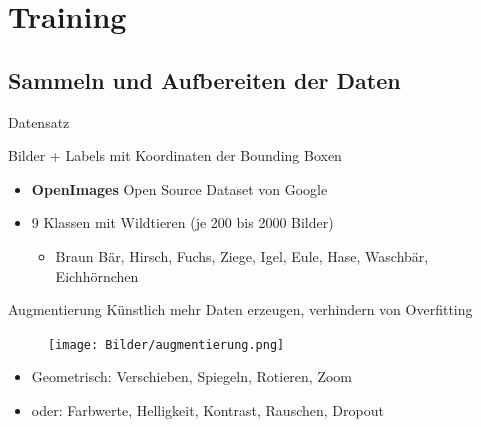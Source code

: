 \section[\thesection \  Training]{Training}\label{sec:training}
%
%


\subsection[\thesection .\thesubsection \ 
Sammeln und Aufbereiten der Daten]{Sammeln und Aufbereiten der Daten}\label{subsec:collect_data}
\begin{frame}{Datensatz}
   
   Bilder + Labels mit Koordinaten der Bounding Boxen

    \begin{itemize}
        \item \textbf{OpenImages} Open Source Dataset von Google
    \end{itemize}
    \begin{itemize}
        \item 9 Klassen mit Wildtieren (je 200 bis 2000 Bilder)
        \begin{itemize}
            \item Braun Bär, Hirsch, Fuchs, Ziege, Igel, Eule, Hase, Waschbär, Eichhörnchen
        \end{itemize}
    \end{itemize}
    \vspace{0.5cm}
    
\end{frame}

\begin{frame}{Augmentierung}
    Künstlich mehr Daten erzeugen, verhindern von Overfitting
        \begin{figure}
            \centering
            \texttt{[image: Bilder/augmentierung.png]}            
        \end{figure}
        \begin{itemize}
            \item Geometrisch: Verschieben, Spiegeln, Rotieren, Zoom
            \item oder: Farbwerte, Helligkeit, Kontrast, Rauschen, Dropout
        \end{itemize}

\end{frame}

